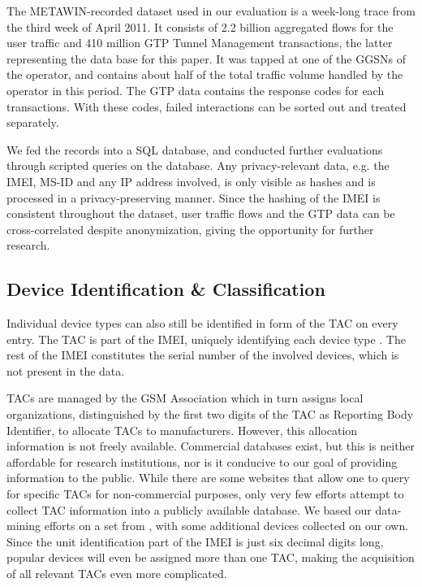 
The \ac{METAWIN}-recorded dataset used in our evaluation is a week-long trace from the third week of April 2011. It consists of 2.2 billion aggregated flows for the user traffic and 410 million \ac{GTP} Tunnel Management transactions, the latter representing the data base for this paper. It was tapped at one of the \acp{GGSN} of the operator, and contains about half of the total traffic volume handled by the operator in this period. The \ac{GTP} data contains the response codes for each transactions. With these codes, failed interactions can be sorted out and treated separately.

We fed the records into a SQL database, and conducted further evaluations through scripted queries on the database. Any privacy-relevant data, e.g. the \ac{IMEI}, \ac{MS-ID} and any IP address involved, is only visible as hashes and is processed in a privacy-preserving manner.  Since the hashing of the \ac{IMEI} is consistent throughout the dataset, user traffic flows and the \ac{GTP} data can be cross-correlated despite anonymization, giving the opportunity for further research.


\subsection{Device Identification \& Classification}

Individual device types can also still be identified in form of the \ac{TAC} on every entry. The \ac{TAC} is part of the \ac{IMEI}, uniquely identifying each device type \cite{3gpp23003}. The rest of the \ac{IMEI} constitutes the serial number of the involved devices, which is not present in the data.

\acp{TAC} are managed by the GSM Association which in turn assigns local organizations, distinguished by the first two digits of the \ac{TAC} as Reporting Body Identifier, to allocate \acp{TAC} to manufacturers. However, this allocation information is not freely available. Commercial databases exist, but this is neither affordable for research institutions, nor is it conducive to our goal of providing information to the public. While there are some websites that allow one to query for specific \acp{TAC} for non-commercial purposes, only very few efforts attempt to collect \ac{TAC} information into a publicly available database. We based our data-mining efforts on a set from \cite{tacdb}, with some additional devices collected on our own. Since the unit identification part of the \ac{IMEI} is just six decimal digits long, popular devices will even be assigned more than one TAC, making the acquisition of all relevant \acp{TAC} even more complicated.

